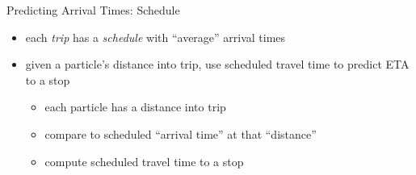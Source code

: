 \documentclass[10pt,t]{beamer}
\begin{document}
\begin{frame}{Predicting Arrival Times: Schedule}
  \onslide<+->

  \begin{itemize}[<+- | alert@+>]
  \item each \emph{trip} has a \emph{schedule} with ``average'' arrival times
  \item given a particle's distance into trip, use scheduled travel time
    to predict ETA to a stop
    \begin{itemize}
    \item each particle has a distance into trip
    \item compare to scheduled ``arrival time'' at that ``distance''
    \item compute scheduled travel time to a stop
    \end{itemize}
  \end{itemize}



\end{frame}
\end{document}
